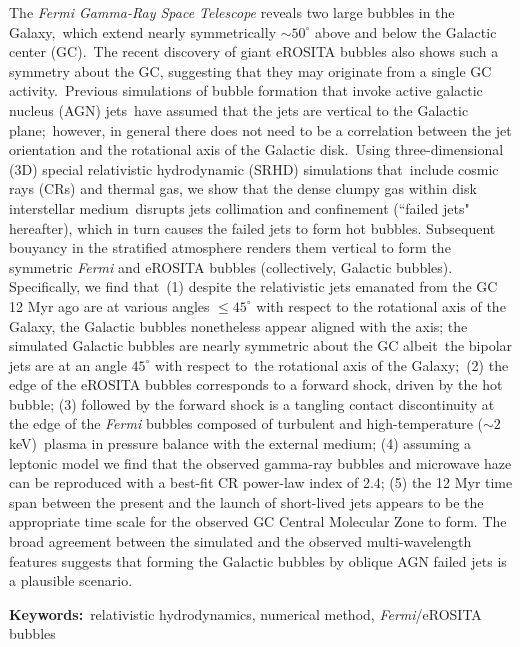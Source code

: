 \begin{abstracten}
The \textit{Fermi Gamma-Ray Space Telescope} reveals two large bubbles in the Galaxy,\
which extend nearly symmetrically $\sim50^{\circ}$ above and below the Galactic center (GC).\
The recent discovery of giant eROSITA bubbles also shows such a symmetry about the GC,
suggesting that they may originate from a single GC activity.\
Previous simulations of bubble formation that invoke active galactic nucleus (AGN) jets\
have assumed that the jets are vertical to the Galactic plane;\
however, in general there does not need to be a correlation between
the jet orientation and the rotational axis of the Galactic disk.\
Using three-dimensional (3D) special relativistic hydrodynamic (SRHD) simulations that\
include cosmic rays (CRs) and thermal gas, we show that the dense clumpy gas within disk interstellar medium\
disrupts jets collimation and confinement (``failed jets" hereafter),
which in turn causes the failed jets to form
hot bubbles. Subsequent bouyancy in the stratified atmosphere renders them vertical to form
the symmetric \textit{Fermi} and eROSITA bubbles (collectively, Galactic bubbles).
Specifically, we find that\
(1) despite the relativistic jets emanated from the GC 12 Myr ago are at various angles
$\leq 45^{\circ}$ with respect to
the rotational axis of the Galaxy, the Galactic bubbles nonetheless appear aligned with the axis;
the simulated Galactic bubbles are nearly symmetric about the GC albeit\
the bipolar jets are at an angle $45^{\circ}$ with respect to\
the rotational axis of the Galaxy;\
(2) the edge of the eROSITA bubbles corresponds to a forward shock, driven by the hot bubble;
(3) followed by the forward shock is a tangling contact discontinuity at the edge of the \textit{Fermi} bubbles
composed of turbulent and high-temperature ($\sim2$ keV)\
plasma in pressure balance with the external medium;
(4) assuming a leptonic model we find that the observed gamma-ray bubbles and microwave haze can be reproduced with
a best-fit CR power-law index of 2.4;
(5) the 12 Myr time span between the present and the launch of short-lived jets appears to be the appropriate time
scale for the observed GC Central Molecular Zone to form.
The broad agreement between the simulated and the
observed multi-wavelength features suggests that forming the Galactic bubbles by
oblique AGN failed jets is a plausible scenario.

\bigbreak
\noindent \textbf{Keywords:}{\, \makeatletter relativistic hydrodynamics, numerical method, \textit{Fermi}/eROSITA bubbles\makeatother}
\end{abstracten}

\begin{comment}
\category{I2.10}{Computing Methodologies}{Artificial Intelligence --
Vision and Scene Understanding} \category{H5.3}{Information
Systems}{Information Interfaces and Presentation (HCI) -- Web-based
Interaction.}

\terms{Design, Human factors, Performance.}

\keywords{Region of interest, Visual attention model, Web-based
games, Benchmarks.}
\end{comment}
